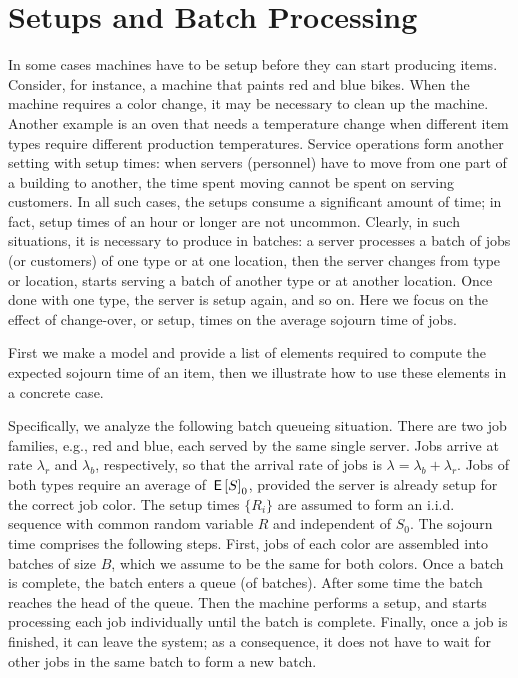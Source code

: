\section{Setups and Batch Processing}
\label{sec:setups-batch-proc}

In some cases machines have to be setup before they can start producing items.
Consider, for instance, a machine that paints red and blue bikes.
When the machine requires a color change, it may be necessary to clean up the machine.
Another example is an oven that needs a temperature change when different item types require different production temperatures.
Service operations form another setting with setup times: when servers (personnel) have to move from one part of a building to another, the time spent moving cannot be spent on serving customers.
In all such cases, the setups consume a significant amount of time; in fact, setup times of an hour or longer are not uncommon.
Clearly, in such situations, it is necessary to produce in batches: a server processes a batch of jobs (or customers) of one type or at one location, then the server changes from type or location, starts serving a batch of another type or at another location.
Once done with one type, the server is setup again, and so on.
Here we focus on the effect of change-over, or setup, times on the average sojourn time of jobs.

First we make a model and provide a list of elements required to compute the expected sojourn time of an item, then we illustrate how to use these elements in a concrete case.




Specifically, we analyze the following batch queueing situation.
There are two job families, e.g., red and blue, each served by the same single server.
Jobs arrive at rate $\lambda_r$ and $\lambda_b$, respectively, so that the arrival rate of jobs is $\lambda= \lambda_b+\lambda_r$.
Jobs of both types require an average  of $\,\mathsf{E}\left[S\right]_0$, provided the server is already setup for the correct job color.
The setup times $\{R_i\}$ are assumed to form an i.i.d.
sequence with common random variable $R$ and independent of $S_0$.
The sojourn time comprises the following steps.
First, jobs of each color are assembled into batches of size $B$, which we assume to be the same for both colors.
Once a batch is complete, the batch enters a queue (of batches).
After some time the batch reaches the head of the queue.
Then the machine performs a setup, and starts processing each job individually until the batch is complete.
Finally, once a job is finished, it can leave the system; as a consequence, it does not have to wait for other jobs in the same batch to form a new batch.




